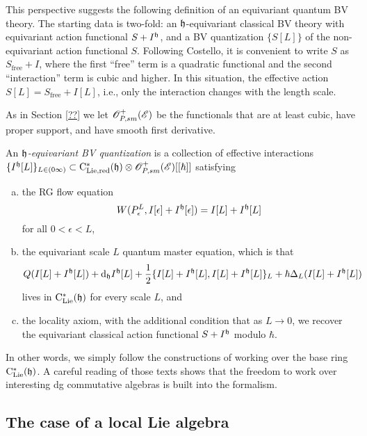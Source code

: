 \documentclass[10pt]{amsart}
\begin{document}
This perspective suggests the following definition of an equivariant quantum BV theory.
The starting data is two-fold:
an $\mathfrak h$-equivariant classical BV theory with equivariant action functional $S+I^\mathfrak h$, 
and a BV quantization $\{S[L]\}$ of the non-equivariant action functional $S$.
Following Costello, it is convenient to write $S$ as $S_{\text{free}} + I$, 
where the first ``free'' term is a quadratic functional and the second ``interaction'' term is cubic and higher.
In this situation, the effective action $S[L] = S_{\text{free}} + I[L]$, 
i.e., only the interaction changes with the length scale.

As in Section \ref{??} we let $\mathscr O_{P,sm}^+(\mathscr E)$ be the functionals that are at least cubic, have proper support, and have smooth first derivative. 

\begin{dfn} \label{eqQFT} 
An {\em $\mathfrak h$-equivariant BV quantization} is a collection of effective interactions $\{I^\mathfrak h[L]\}_{L \in (0\infty)} \subset {\rm C}_{\rm Lie, red}^*(\mathfrak h) \otimes \mathscr O_{P,sm}^+(\mathscr E)[[\hbar]]$
satisfying
\begin{enumerate}[(a)]
\item the RG flow equation
\[
W(P_\epsilon^L, I[\epsilon]+I^\mathfrak h[\epsilon]) = I[L] + I^\mathfrak h[L]
\]
for all $0 < \epsilon < L$,
\item the equivariant scale $L$ quantum master equation, which is that
\[
Q(I[L]+I^\mathfrak h[L]) + {\rm d}_\mathfrak h I^\mathfrak h[L] + \frac{1}{2}\{I[L]+I^\mathfrak h[L],I[L]+I^\mathfrak h[L]\}_{L} + \hbar \Delta_L(I[L]+I^\mathfrak h[L])
\]
lives in ${\rm C}_{{\rm Lie}}^*(\mathfrak h)$ for every scale $L$, and
\item the locality axiom, with the additional condition that as $L \to 0$, we recover the equivariant classical action functional $S+ I^\mathfrak h$ modulo $\hbar$.
\end{enumerate}
\end{dfn}

In other words, we simply follow the constructions of \cite{CosRenormalization} working over the base ring ${\rm C}_{{\rm Lie}}^*(\mathfrak h)$.
A careful reading of those texts shows that the freedom to work over interesting dg commutative algebras is built into the formalism.

\subsection{The case of a local Lie algebra}\label{sec: local equiv}
\end{document}
